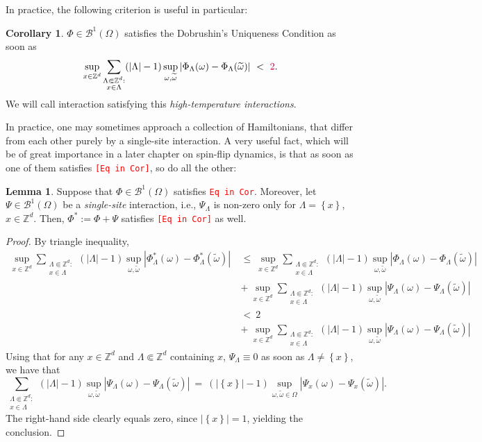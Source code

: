 \documentclass[12pt]{article}
\newcommand{\BB}{\mathscr{B}}
\newcommand{\Z}{\mathbb{Z}}
\newcommand{\set}[1]{\left\{#1\right\}}
\newcommand{\1}{\mathbbm{1}}
\newcommand{\5}{\vspace{0.5cm}}
\renewcommand{\tilde}{\widetilde}
\theoremstyle{definition}
\newtheorem{lem}[thm]{Lemma}
\newtheorem{cor}[thm]{Corollary}
\begin{document}
In practice, the following criterion is useful in particular:

\begin{cor}
$\Phi\in\BB^1(\Omega)$ satisfies the Dobrushin's Uniqueness Condition as soon as
$$\sup_{x\in\Z^d}\sum_{\substack{\Lambda\Subset\Z^d:\\x\in\Lambda}}(|\Lambda|-1)\sup_{\omega,\tilde{\omega}}|\Phi_\Lambda(\omega)-\Phi_\Lambda(\tilde{\omega})| ~<~ \textcolor{purple}{2}.$$
We will call interaction satisfying this \textit{high-temperature interactions}.
\end{cor}

In practice, one may sometimes approach a collection of Hamiltonians, that differ from each other purely by a single-site interaction. A very useful fact, which will be of great importance in a later chapter on spin-flip dynamics, is that as soon as one of them satisfies \textcolor{red}{\texttt{[Eq in Cor]}}, so do all the other:
\begin{lem}
Suppose that $\Phi\in\BB^1(\Omega)$ satisfies \textcolor{red}{\texttt{Eq in Cor}}. Moreover, let $\Psi\in\BB^1(\Omega)$ be a \textit{single-site} interaction, i.e., $\Psi_\Lambda$ is non-zero only for $\Lambda=\set{x}$, $x\in\Z^d$. Then, $\Phi^*:=\Phi+\Psi$ satisfies \textcolor{red}{\texttt{[Eq in Cor]}} as well.
\end{lem}

\begin{proof}
By triangle inequality,
\begin{align*}
\sup_{x\in\Z^d}\sum_{\substack{\Lambda\Subset\Z^d:\\x\in\Lambda}}(|\Lambda|-1)\sup_{\omega,\tilde{\omega}}|\Phi_\Lambda^*(\omega)-\Phi_\Lambda^*(\tilde{\omega})| ~&\leq~ \sup_{x\in\Z^d}\sum_{\substack{\Lambda\Subset\Z^d:\\x\in\Lambda}}(|\Lambda|-1)\sup_{\omega,\tilde{\omega}}|\Phi_\Lambda(\omega)-\Phi_\Lambda(\tilde{\omega})| \\
&+~ \sup_{x\in\Z^d}\sum_{\substack{\Lambda\Subset\Z^d:\\x\in\Lambda}}(|\Lambda|-1)\sup_{\omega,\tilde{\omega}}|\Psi_\Lambda(\omega)-\Psi_\Lambda(\tilde{\omega})| \\
&<~ 2 \\
&+~ \sup_{x\in\Z^d}\sum_{\substack{\Lambda\Subset\Z^d:\\x\in\Lambda}}(|\Lambda|-1)\sup_{\omega,\tilde{\omega}}|\Psi_\Lambda(\omega)-\Psi_\Lambda(\tilde{\omega})|
\end{align*}
Using that for any $x\in\Z^d$ and $\Lambda\Subset\Z^d$ containing $x$, $\Psi_\Lambda\equiv 0$ as soon as $\Lambda\neq\set{x}$, we have that
$$\sum_{\substack{\Lambda\Subset\Z^d:\\x\in\Lambda}}(|\Lambda|-1)\sup_{\omega,\tilde{\omega}}|\Psi_\Lambda(\omega)-\Psi_\Lambda(\tilde{\omega})| ~=~ (|\!\set{x}\!|-1)\sup_{\omega,\tilde{\omega}\in\Omega}|\Psi_x(\omega)-\Psi_x(\tilde{\omega})|.$$
The right-hand side clearly equals zero, since $|\!\set{x}\!|=1$, yielding the conclusion.
\end{proof} 
\end{document}
